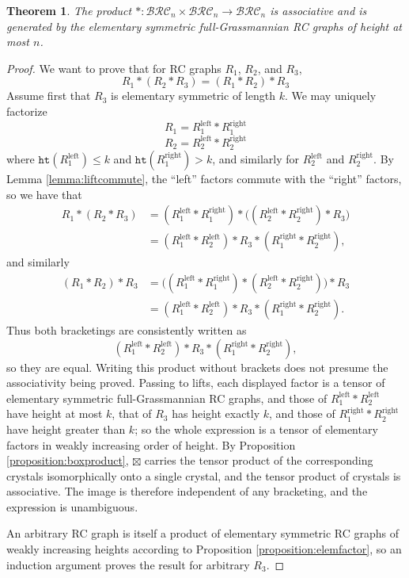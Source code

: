 \documentclass{amsart}
\newtheorem{theorem}{Theorem}[section]
\theoremstyle{definition}
\theoremstyle{remark}
\numberwithin{equation}{subsection}
\newcommand{\hr}{\mathtt{ht}}
\newcommand{\BRC}{\mathcal{BRC}}
\begin{document}
\begin{theorem}\label{theorem:liftassoc}
The product $*:\BRC_n\times\BRC_n\to\BRC_n$ is associative and is generated by the elementary symmetric full-Grassmannian RC graphs of height at most $n$.
\end{theorem}
\begin{proof}
We want to prove that for RC graphs $R_1$, $R_2$, and $R_3$,
$$R_1*(R_2*R_3) = (R_1*R_2)*R_3$$
Assume first that $R_3$ is elementary symmetric of length $k$. We may uniquely factorize 
$$R_1 = R_1^{\mathrm{left}}* R_1^{\mathrm{right}}$$
$$R_2 = R_2^{\mathrm{left}}* R_2^{\mathrm{right}}$$
where $\hr(R_1^{\mathrm{left}}) \leq k$ and $\hr(R_1^{\mathrm{right}}) > k$, and similarly for $R_2^{\mathrm{left}}$ and $R_2^{\mathrm{right}}$. 
By Lemma \ref{lemma:liftcommute}, the ``left'' factors commute with the ``right'' factors, so we have that
\begin{align*}
R_1*(R_2*R_3)
&= (R_1^{\mathrm{left}}*R_1^{\mathrm{right}})*\big((R_2^{\mathrm{left}}*R_2^{\mathrm{right}})*R_3\big)\\
&= (R_1^{\mathrm{left}}*R_2^{\mathrm{left}})*R_3*(R_1^{\mathrm{right}}*R_2^{\mathrm{right}}),
\end{align*}
and similarly
\begin{align*}
(R_1*R_2)*R_3
&= \big((R_1^{\mathrm{left}}*R_1^{\mathrm{right}})*(R_2^{\mathrm{left}}*R_2^{\mathrm{right}})\big)*R_3\\
&= (R_1^{\mathrm{left}}*R_2^{\mathrm{left}})*R_3*(R_1^{\mathrm{right}}*R_2^{\mathrm{right}}).
\end{align*}
Thus both bracketings are consistently written as
$$
(R_1^{\mathrm{left}}*R_2^{\mathrm{left}})*R_3*(R_1^{\mathrm{right}}*R_2^{\mathrm{right}}),
$$
so they are equal. Writing this product without brackets does not presume the associativity being proved. Passing to lifts, each displayed factor is a tensor of elementary symmetric full-Grassmannian RC graphs, and those of $R_1^{\mathrm{left}}*R_2^{\mathrm{left}}$ have height at most $k$, that of $R_3$ has height exactly $k$, and those of $R_1^{\mathrm{right}}*R_2^{\mathrm{right}}$ have height greater than $k$; so the whole expression is a tensor of elementary factors in weakly increasing order of height. By Proposition \ref{proposition:boxproduct}, $\boxtimes$ carries the tensor product of the corresponding crystals isomorphically onto a single crystal, and the tensor product of crystals is associative. The image is therefore independent of any bracketing, and the expression is unambiguous.

An arbitrary RC graph is itself a product of elementary symmetric RC graphs of weakly increasing heights according to Proposition \ref{proposition:elemfactor}, so an induction argument proves the result for arbitrary $R_3$.
\end{proof}
\end{document}
